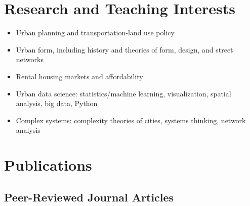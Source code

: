 \documentclass{academiccv}
\begin{document}
\section*{Research and Teaching Interests}

\begin{itemize}
	
\item Urban planning and transportation-land use policy

\item Urban form, including history and theories of form, design, and street networks

\item Rental housing markets and affordability

\item Urban data science: statistics/machine learning, visualization, spatial analysis, big data, Python

\item Complex systems: complexity theories of cities, systems thinking, network analysis

\end{itemize}



\section*{Publications}

\subsection*{Peer-Reviewed Journal Articles}
\end{document}
